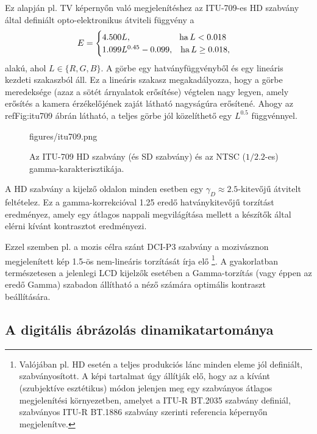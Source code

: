 Ez alapján pl. TV képernyőn való megjelenítéshez az ITU-709-es HD szabvány által definiált opto-elektronikus átviteli függvény a
\begin{equation}
E = 
\begin{cases}
4.500 L, \hspace{20mm} \mathrm{ha}\, L < 0.018 \\
1.099 L^{0.45} - 0.099, \hspace{3mm} \mathrm{ha}\, L \geq 0.018,
\end{cases}
\end{equation}
alakú, ahol $L \in \{ R, G, B \}$.
A görbe egy hatványfüggvényből és egy lineáris kezdeti szakaszból áll.
Ez a lineáris szakasz megakadályozza, hogy a görbe meredeksége (azaz a sötét árnyalatok erősítése) végtelen nagy legyen, amely erősítés a kamera érzékelőjének zaját látható nagyságúra erősítené.
Ahogy az ref{Fig:itu709} ábrán látható, a teljes görbe jól közelíthető egy $L^{0.5}$ függvénnyel.
\begin{figure}[]
	\centering
	\begin{overpic}[width = 0.7\columnwidth ]{figures/itu709.png}
	\end{overpic}
	\caption{Az ITU-709 HD szabvány (és SD szabvány) és az NTSC ($1/2.2$-es) gamma-karakterisztikája.}
	\label{Fig:itu709}
\end{figure}
A HD szabvány a kijelző oldalon minden esetben egy $\gamma_D \approx 2.5$-kitevőjű átvitelt feltételez.
Ez a gamma-korrekcióval 1.25 eredő hatványkitevőjű torzítást eredményez, amely egy átlagos nappali megvilágítása mellett a készítők által elérni kívánt kontrasztot eredményezi.

Ezzel szemben pl. a mozis célra szánt DCI-P3 szabvány a mozivásznon megjelenített kép 1.5-ös nem-lineáris torzítását írja elő \footnote{Valójában pl. HD esetén a teljes produkciós lánc minden eleme jól definiált, szabványosított.
A képi tartalmat úgy állítják elő, hogy az a kívánt (szubjektíve esztétikus) módon jelenjen meg egy szabványos átlagos megjelenítési környezetben, amelyet a ITU-R BT.2035 szabvány definiál, szabványos ITU-R BT.1886 szabvány szerinti referencia képernyőn megjelenítve.}.
A gyakorlatban természetesen a jelenlegi LCD kijelzők esetében a Gamma-torzítás (vagy éppen az eredő Gamma) szabadon állítható a néző számára optimális kontraszt beállítására.

\subsection{A digitális ábrázolás dinamikatartománya}

